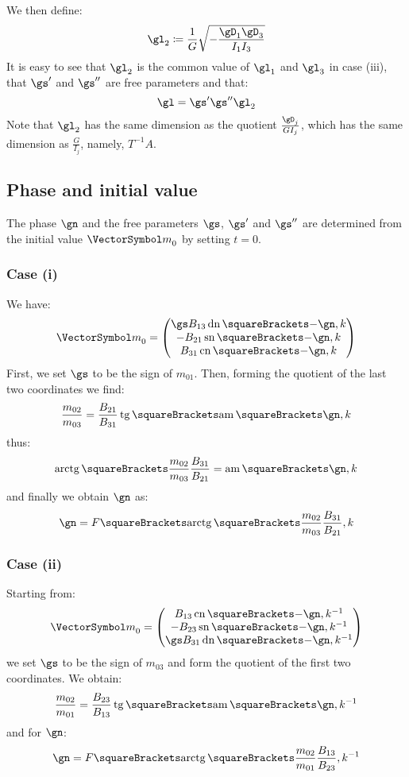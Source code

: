 \documentclass[10pt, a4paper, twoside]{basestyle}
\begin{document}
We then define:
\[
\gl_2 \DefineAs \frac{1}{G} \sqrt{-\frac{\gD_1 \gD_3}{I_1 I_3}}
\]
It is easy to see that $\gl_2$ is the common value of $\gl_1$ and $\gl_3$ in case (iii), that $\gs'$ and $\gs''$ are free parameters and that:
\[
\gl = \gs' \gs'' \gl_2
\]
Note that $\gl_2$ has the same dimension as the quotient $\frac{\gD_j}{G I_j}$, which has the same dimension as $\frac{G}{I_j}$, namely, $T^{-1} A$.

\subsection*{Phase and initial value}
The phase $\gn$ and the free parameters $\gs$, $\gs'$ and $\gs''$ are determined from the initial value ${\vm}_0$ by setting $t = 0$.
\subsubsection*{Case (i)}
We have:
\[
{\vm}_0 =
\begin{pmatrix}
\gs B_{13} \JacobiDN\of{-\gn, k} \\
-B_{21} \JacobiSN\of{-\gn, k} \\
B_{31} \JacobiCN\of{-\gn, k}
\end{pmatrix}
\]
First, we set $\gs$ to be the sign of $m_{01}$.  Then, forming the quotient of the last two coordinates we find:
\[
\frac{m_{02}}{m_{03}} = \frac{B_{21}}{B_{31}}\TrigonometricTangent\of{\JacobiAmplitude\of{\gn, k}}
\]
thus:
\[
\InverseTrigonometricTangent\of{\frac{m_{02}}{m_{03}} \frac{B_{31}}{B_{21}}} = \JacobiAmplitude\of{\gn, k}
\]
and finally we obtain $\gn$ as:
\[
\gn = F\of{\InverseTrigonometricTangent\of{\frac{m_{02}}{m_{03}} \frac{B_{31}}{B_{21}}}, k}
\]

\subsubsection*{Case (ii)}
Starting from:
\[
{\vm}_0 =
\begin{pmatrix}
B_{13} \JacobiCN\of{-\gn, k^{-1}} \\
-B_{23} \JacobiSN\of{-\gn, k^{-1}} \\
\gs B_{31} \JacobiDN\of{-\gn, k^{-1}}
\end{pmatrix}
\]
we set $\gs$ to be the sign of $m_{03}$ and form the quotient of the first two coordinates.  We obtain:
\[
\frac{m_{02}}{m_{01}} = \frac{B_{23}}{B_{13}} \TrigonometricTangent\of{\JacobiAmplitude\of{\gn, k^{-1}}} 
\]
and for $\gn$:
\[
\gn = F\of{\InverseTrigonometricTangent\of{\frac{m_{02}}{m_{01}} \frac{B_{13}}{B_{23}}}, k^{-1}}
\]
\end{document}
